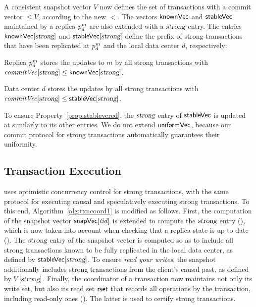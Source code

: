 A consistent snapshot vector $V$ now defines the set of transactions with a
commit vector $\le V$, according to the new $<$. The vectors
${\sf knownVec}$ and ${\sf stableVec}$ maintained by a replica
$\partition^m_d$ are also extended with a $\textsl{strong}$ entry. The entries
${\sf knownVec}[\textsl{strong}]$ and ${\sf stableVec}[\textsl{strong}]$ define the prefix of
strong transactions that have been replicated at $\partition^m_d$ and the local
data center $d$, respectively:
\begin{property}
\label{prop:knownvcred}
Replica $\partition^m_d$ stores the updates to $m$ by all strong
transactions with $\commitvector[\red]\leq \replicavectorclock[\red]$.
\end{property}
\begin{property}
\label{prop:stablevcred}
Data center $d$ stores the updates by all strong transactions with
$\commitvector[\red]\leq \stablesnapshot[\red]$.
\end{property}
To ensure Property~\ref{prop:stablevcred}, the $\textsl{strong}$ entry of ${\sf stableVec}$
is updated at  similarly to its other
entries. We do not extend ${\sf uniformVec}$, because our commit protocol for
strong transactions automatically guarantees their uniformity.






\subsection{Transaction Execution}
\label{sec:redexecution}

\System uses optimistic concurrency control for strong transactions, with the
same protocol for executing causal and speculatively executing strong
transactions. To this end, Algorithm~\ref{alg:txncoord1} is modified as
follows. First, the computation of the snapshot vector $\vecsnapshottime[\tx]$
is extended to compute the $\textsl{strong}$ entry
(), which is now taken into
account when checking that a replica state is up to date
().  The $\textsl{strong}$ entry of the
snapshot vector is computed so as to include all strong transactions known to be
fully replicated in the local data center, as defined by
${\sf stableVec}[\textsl{strong}]$. To ensure {\em read your writes}, the snapshot
additionally includes strong transactions from the client's causal past, as
defined by $\avc[\red]$. Finally, the coordinator of a transaction now maintains
not only its write set, but also its read set ${\sf rset}$ that records all
operations by the transaction, including read-only ones
(). The latter is used to certify strong
transactions.


